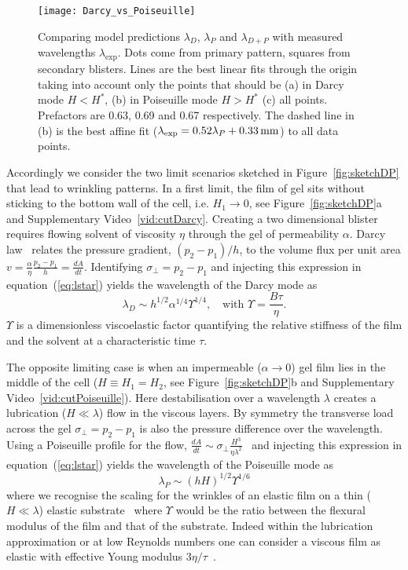 \documentclass[twocolumn,superscriptaddress,showpacs,preprintnumbers,
amsmath,amssymb,prl]{revtex4-1}
\begin{document}
\begin{figure*}
	\texttt{[image: Darcy\_vs\_Poiseuille]}
	\caption{Comparing model predictions $\lambda_D$, $\lambda_P$ and $\lambda_{D+P}$ with measured wavelengths $\lambda_\text{exp}$. Dots come from primary pattern, squares from secondary blisters. Lines are the best linear fits through the origin taking into account only the points that should be (a) in Darcy mode $H<H^*$, (b) in Poiseuille mode $H>H^*$ (c) all points. Prefactors are 0.63, 0.69 and 0.67 respectively. The dashed line in (b) is the best affine fit ($\lambda_{\rm exp}=0.52\lambda_{P}+\SI{0.33}{\milli\metre}$) to all data points.}
	\label{fig:DarcyPoiseuille}
\end{figure*}

Accordingly we consider the two limit scenarios sketched in Figure~\ref{fig:sketchDP} that lead to wrinkling patterns. In a first limit, the film of gel sits without sticking to the bottom wall of the cell, i.e. $H_1\rightarrow0$, see Figure~\ref{fig:sketchDP}a and Supplementary Video~\ref{vid:cutDarcy}. Creating a two dimensional blister requires flowing solvent of viscosity $\eta$ through the gel of permeability $\alpha$. Darcy law~\cite{Darcy1856} relates the pressure gradient, $(p_2-p_1)/h$, to the volume flux per unit area $v = \frac{\alpha}{\eta}\frac{p_2-p_1}{h} = \frac{dA}{dt}$. Identifying $\sigma_{\perp}=p_2-p_1$ and injecting this expression in equation~(\ref{eq:lstar}) yields the wavelength of the Darcy mode as
\begin{equation}
\lambda_D \sim h^{1/2} \alpha^{1/4} \Upsilon^{1/4},\quad\text{with } \Upsilon = \frac{B\tau}{\eta}.
\end{equation}
$\Upsilon$ is a dimensionless viscoelastic factor quantifying the relative stiffness of the film and the solvent at a characteristic time $\tau$. 

The opposite limiting case is when an impermeable ($\alpha\rightarrow 0$) gel film lies in the middle of the cell ($H\equiv H_1=H_2$, see Figure~\ref{fig:sketchDP}b and Supplementary Video~\ref{vid:cutPoiseuille}). Here destabilisation over a wavelength $\lambda$ creates a lubrication ($H\ll\lambda$) flow in the viscous layers. By symmetry the transverse load across the gel $\sigma_{\perp}=p_2-p_1$ is also the pressure difference over the wavelength. Using a Poiseuille profile for the flow, $\frac{dA}{dt} \sim \sigma_{\perp} \frac{H^3}{\eta\lambda^2}$~\cite{Poiseuille1842} and injecting this expression in equation~(\ref{eq:lstar}) yields the wavelength of the Poiseuille mode as
\begin{equation}
\lambda_P \sim (hH)^{1/2} \Upsilon^{1/6}
\end{equation}
where we recognise the scaling for the wrinkles of an elastic film on a thin ($H\ll\lambda$) elastic substrate~\cite{Cerda2003} where $\Upsilon$ would be the ratio between the flexural modulus of the film and that of the substrate. Indeed within the lubrication approximation or at low Reynolds numbers one can consider a viscous film as elastic with effective Young modulus $3\eta/\tau$~\cite{Biot1957,Boudaoud2001}.
\end{document}
